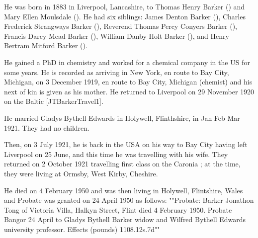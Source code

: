 
He was born in 1883 \cite{JTBarkerBirth} in Liverpool, Lancashire, to Thomas Henry Barker () and Mary Ellen Moulsdale (). He had six siblings:  James Denton Barker (), Charles Frederick Strangways Barker (),  Reverend Thomas Percy Conyers Barker (), Francis Darcy Mead Barker (), William Danby Holt Barker (), and Henry Bertram Mitford Barker (). 

He gained a PhD in chemistry and worked for a chemical company in the US for some years. He is recorded as arriving in New York, en route to Bay City, Michigan, on 3 December 1919, en route to Bay City, Michigan (chemist) and his next of kin is given as his mother. He returned to Liverpool on 29 November 1920 on the Baltic [JTBarkerTravel1]. 

He married Gladys Bythell Edwards in Holywell, Flinthshire, in Jan-Feb-Mar 1921. They had  no children.

 Then, on 3 July 1921, he is back in the USA on his way to Bay City having left Liverpool on 25 June, and this time he was travelling with his wife. They returned on 2 October 1921 travelling first class on the Caronia \cite{JTBarkerTravel2};  at the time,  they were living at Ormsby, West Kirby, Cheshire. 

He died on 4 February 1950 and was then living in Holywell, Flintshire, Wales and Probate was granted  on 24 April 1950 as follows:   
""Probate: Barker Jonathon Tong of Victoria Villa, Halkyn Street, Flint died 4 February 1950. Probate Bangor 24 April to Gladys Bythell Barker widow and Wilfred Bythell Edwards university professor. Effects (pounds) 1108.12s.7d""


